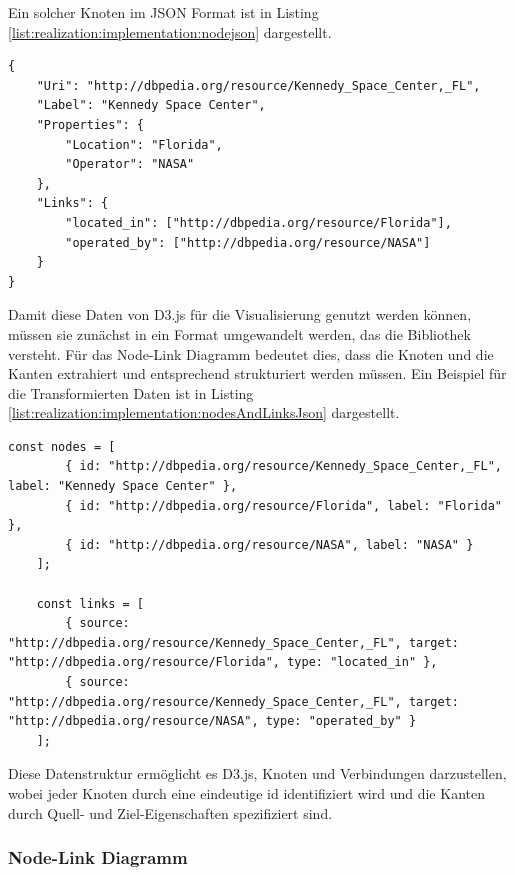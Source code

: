 Ein solcher Knoten im JSON Format ist in Listing \ref{list:realization:implementation:nodejson} dargestellt.

\begin{lstlisting}[caption={Informationen einer Node im JSON Format.}, label={list:realization:implementation:nodejson}]
{
    "Uri": "http://dbpedia.org/resource/Kennedy_Space_Center,_FL",
    "Label": "Kennedy Space Center",
    "Properties": {
        "Location": "Florida",
        "Operator": "NASA"
    },
    "Links": {
        "located_in": ["http://dbpedia.org/resource/Florida"],
        "operated_by": ["http://dbpedia.org/resource/NASA"]
    }
}
\end{lstlisting}

Damit diese Daten von D3.js für die Visualisierung genutzt werden können, müssen sie zunächst in ein Format umgewandelt werden, das die Bibliothek versteht. Für das Node-Link Diagramm bedeutet dies, dass die Knoten und die Kanten extrahiert und entsprechend strukturiert werden müssen. Ein Beispiel für die Transformierten Daten ist in Listing \ref{list:realization:implementation:nodesAndLinksJson} dargestellt.

\begin{lstlisting}[caption={Informationen einer Node im JSON Format.}, label={list:realization:implementation:nodesAndLinksJson}]
    const nodes = [
        { id: "http://dbpedia.org/resource/Kennedy_Space_Center,_FL", label: "Kennedy Space Center" },
        { id: "http://dbpedia.org/resource/Florida", label: "Florida" },
        { id: "http://dbpedia.org/resource/NASA", label: "NASA" }
    ];
    
    const links = [
        { source: "http://dbpedia.org/resource/Kennedy_Space_Center,_FL", target: "http://dbpedia.org/resource/Florida", type: "located_in" },
        { source: "http://dbpedia.org/resource/Kennedy_Space_Center,_FL", target: "http://dbpedia.org/resource/NASA", type: "operated_by" }
    ];
\end{lstlisting}

Diese Datenstruktur ermöglicht es D3.js, Knoten und Verbindungen darzustellen, wobei jeder Knoten durch eine eindeutige id identifiziert wird und die Kanten durch Quell- und Ziel-Eigenschaften spezifiziert sind.

\subsubsection{Node-Link Diagramm}

